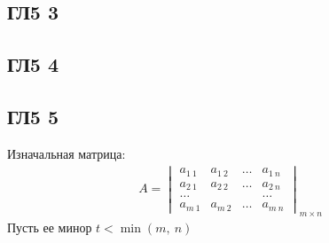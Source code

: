 		\subsection{ГЛ5 3}
		
		\subsection{ГЛ5 4}
		
		\subsection{ГЛ5 5}
		Изначальная матрица:\\
		\begin{gather*}
			A=
			\begin{vmatrix}
				{a_{1\ 1}} & {a_{1\ 2}} & {\dots} & {a_{1\  n}}\\
				{a_{2\ 1}} & {a_{2\ 2}} & {\dots} & {a_{2\  n}}\\
				{\dots} & {} & {} & {\dots}\\
				{a_{m\  1}} & {a_{m\  2}} & {\dots} & {a_{m\  n}}
			\end{vmatrix}
			_{m \times n}
		\end{gather*}
		Пусть ее минор $t < \min(m,\ n)$\\
		
